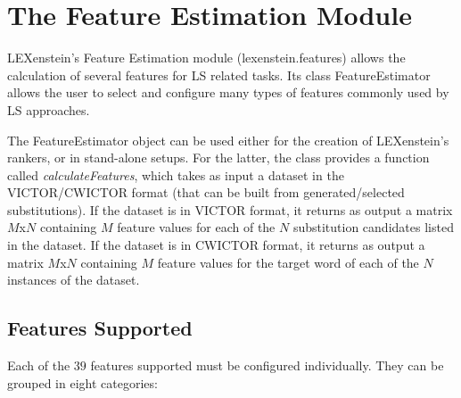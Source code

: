 \chapter{The Feature Estimation Module}
\label{features}

LEXenstein's Feature Estimation module (lexenstein.features) allows the calculation of several features for LS related tasks. Its class FeatureEstimator allows the user to select and configure many types of features commonly used by LS approaches.

The FeatureEstimator object can be used either for the creation of LEXenstein's rankers, or in stand-alone setups. For the latter, the class provides a function called \textit{calculateFeatures}, which takes as input a dataset in the VICTOR/CWICTOR format (that can be built from generated/selected substitutions). If the dataset is in VICTOR format, it returns as output a matrix $M$x$N$ containing $M$ feature values for each of the $N$ substitution candidates listed in the dataset. If the dataset is in CWICTOR format, it returns as output a matrix $M$x$N$ containing $M$ feature values for the target word of each of the $N$ instances of the dataset.







\section{Features Supported}

Each of the $39$ features supported must be configured individually. They can be grouped in eight categories:

